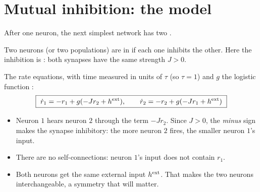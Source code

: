 \section{Mutual inhibition: the model}

After one neuron, the next simplest network has two .

\begin{defn}
Two neurons (or two populations) are in  if each one inhibits the other. Here the inhibition is : both synapses have the same strength $J>0$.
\end{defn}

\begin{center}
\end{center}

The rate equations, with time measured in units of $\tau$ (so $\tau=1$) and $g$ the logistic function :
\[ \boxed{\ \dot r_1 = -r_1 + g(-Jr_2+\hext),\qquad \dot r_2 = -r_2 + g(-Jr_1+\hext)\ } \]
\begin{itemize}
  \item Neuron $1$ hears neuron $2$ through the term $-Jr_2$. Since $J>0$, the \emph{minus} sign makes the synapse inhibitory: the more neuron $2$ fires, the smaller neuron $1$'s input.
  \item There are no self-connections: neuron $1$'s input does not contain $r_1$.
  \item Both neurons get the same external input $h^{\text{ext}}$. That makes the two neurons interchangeable, a symmetry that will matter.
\end{itemize}

